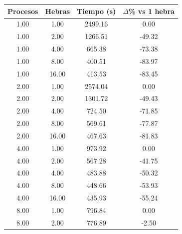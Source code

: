 \begin{table}[ht]
    \centering
    \begin{tabular}{|c|c|c|c|}
        \hline
        \textbf{Procesos} & \textbf{Hebras} & \textbf{Tiempo (s)} & \textbf{$\Delta$\% vs 1 hebra} \\
        \hline
        1.00              & 1.00            & 2499.16             & 0.00                           \\
        1.00              & 2.00            & 1266.51             & -49.32                         \\
        1.00              & 4.00            & 665.38              & -73.38                         \\
        1.00              & 8.00            & 400.51              & -83.97                         \\
        1.00              & 16.00           & 413.53              & -83.45                         \\
        2.00              & 1.00            & 2574.04             & 0.00                           \\
        2.00              & 2.00            & 1301.72             & -49.43                         \\
        2.00              & 4.00            & 724.50              & -71.85                         \\
        2.00              & 8.00            & 569.61              & -77.87                         \\
        2.00              & 16.00           & 467.63              & -81.83                         \\
        4.00              & 1.00            & 973.92              & 0.00                           \\
        4.00              & 2.00            & 567.28              & -41.75                         \\
        4.00              & 4.00            & 483.88              & -50.32                         \\
        4.00              & 8.00            & 448.66              & -53.93                         \\
        4.00              & 16.00           & 435.93              & -55.24                         \\
        8.00              & 1.00            & 796.84              & 0.00                           \\
        8.00              & 2.00            & 776.89              & -2.50                          \\

\end{tabular}
\end{table}
